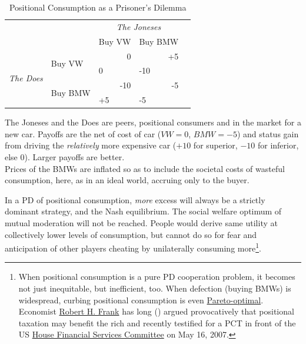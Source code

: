 \begin{table}
	\caption{Positional Consumption as a Prisoner's Dilemma}
	\label{tab:PositionalPD}
	\begin{center}
	\begin{tabular}{m{1cm}m{}m{}m{}m{}}
		& & \multicolumn{2}{c}{\emph{The Joneses}} \\
		& &Buy VW & Buy BMW\\ 
		\cline{3-4}
		\multicolumn{1}{c}{\multirow{4}{*}{\emph{The Does}}} & \multirow{2}{2,3cm}{Buy VW} & 		\multicolumn{1}{|r|}{0} & \multicolumn{1}{r|}{+5}\\ 
		\multicolumn{1}{c}{} & \multicolumn{1}{c}{}& \multicolumn{1}{|l|}{0} & \multicolumn{1}{l|}{-10}\\ 
		\cline{3-4}
		\multicolumn{1}{c}{} & \multirow{2}{2,3cm}{Buy BMW} & \multicolumn{1}{|r|}{-10} & \multicolumn{1}{r|}{-5}\\ 
		\multicolumn{1}{c}{} & \multicolumn{1}{c}{}& \multicolumn{1}{|l|}{+5} & \multicolumn{1}{l|}{-5}\\ 
		\cline{3-4}
	\end{tabular}
	\end{center}
	\scriptsize{The Joneses and the Does are peers, positional consumers and in the market for a new car. Payoffs are the net of cost of car ($VW=0$, $BMW=-5$) and status gain from driving the \emph{relatively} more expensive car ($+10$ for superior, $-10$ for inferior, else $0$). Larger payoffs are better.\\
	Prices of the BMWs are inflated so as to include the societal costs of wasteful consumption, here, as in an ideal world, accruing only to the buyer.}
\end{table}

In a \gls{PD} of positional consumption, \emph{more} excess will always be a strictly dominant strategy, and the Nash equilibrium. The social welfare optimum of mutual moderation will not be reached. People would derive same utility at collectively lower levels of consumption, but cannot do so for fear and anticipation of other players cheating by unilaterally consuming more\footnote{
	When positional consumption is a pure \gls{PD} cooperation problem, it becomes not just inequitable, but inefficient, too. When defection (buying BMWs) is widespread, curbing positional consumption is even \hyperref[sec:Pareto]{Pareto-optimal}. Economist \hyperref[http://www.robert-h-frank.com]{Robert H. Frank} has long (\citeyear{Frank1987}) argued provocatively that positional taxation may benefit the rich and recently testified for a \gls{PCT} in front of the US \hyperref[http://financialservices.house.gov/]{House Financial Services Committee} on May 16, 2007.}.

